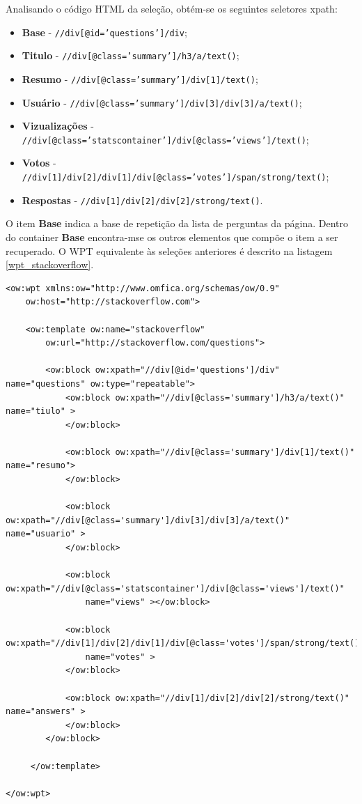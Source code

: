 Analisando o código HTML da seleção, obtém-se os seguintes seletores \gls{xpath}:

\begin{itemize}
	\item \textbf{Base} - \texttt{//div[@id='questions']/div};
	\item \textbf{Titulo} - \texttt{//div[@class='summary']/h3/a/text()};
	\item \textbf{Resumo} - \texttt{//div[@class='summary']/div[1]/text()};
	\item \textbf{Usuário} - \texttt{//div[@class='summary']/div[3]/div[3]/a/text()};
	\item \textbf{Vizualizações} - \texttt{//div[@class='statscontainer']/div[@class='views']/text()};
	\item \textbf{Votos} - \texttt{//div[1]/div[2]/div[1]/div[@class='votes']/span/strong/text()};
	\item \textbf{Respostas} - \texttt{//div[1]/div[2]/div[2]/strong/text()}.
\end{itemize}

O item \textbf{Base} indica a base de repetição da lista de perguntas da página. Dentro do container \textbf{Base} encontra-mse os outros elementos que compõe o item a ser recuperado. O WPT equivalente às seleções anteriores é descrito na listagem \ref{wpt_stackoverflow}.

\begin{lstlisting}[label=wpt_stackoverflow]
<ow:wpt xmlns:ow="http://www.omfica.org/schemas/ow/0.9"
    ow:host="http://stackoverflow.com">
      
    <ow:template ow:name="stackoverflow" 
        ow:url="http://stackoverflow.com/questions">
       
        <ow:block ow:xpath="//div[@id='questions']/div" name="questions" ow:type="repeatable"> 
            <ow:block ow:xpath="//div[@class='summary']/h3/a/text()" name="tiulo" >
            </ow:block>
            
            <ow:block ow:xpath="//div[@class='summary']/div[1]/text()" name="resumo"> 
            </ow:block>
            
            <ow:block ow:xpath="//div[@class='summary']/div[3]/div[3]/a/text()" name="usuario" >
            </ow:block>

            <ow:block ow:xpath="//div[@class='statscontainer']/div[@class='views']/text()" 
                name="views" ></ow:block>

            <ow:block ow:xpath="//div[1]/div[2]/div[1]/div[@class='votes']/span/strong/text()" 
                name="votes" >
            </ow:block>

            <ow:block ow:xpath="//div[1]/div[2]/div[2]/strong/text()" name="answers" >
            </ow:block>
        </ow:block>
              
     </ow:template> 

</ow:wpt>
\end{lstlisting}

